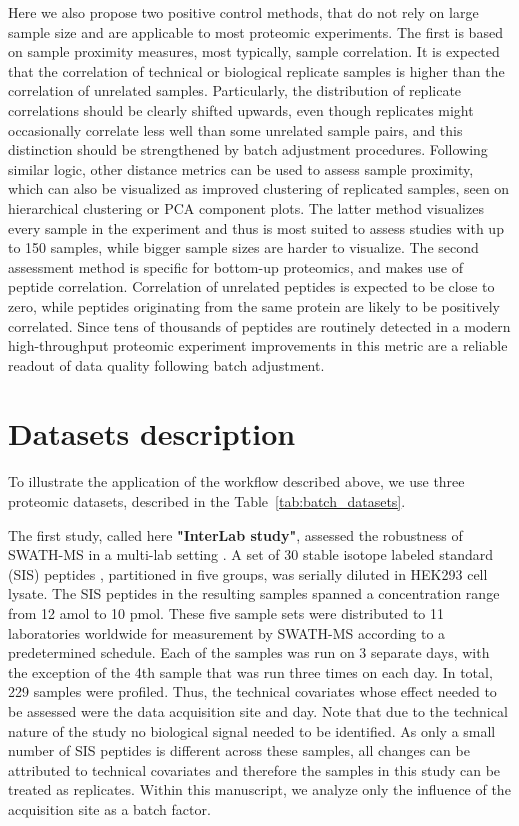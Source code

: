 \documentclass[num-refs]{wiley-article}
\begin{document}
Here we also propose two positive control methods, that do not rely on large sample size and are applicable to most proteomic experiments. The first is based on sample proximity measures, most typically, sample correlation. It is expected that the correlation of technical or biological replicate samples is higher than the correlation of unrelated samples. Particularly, the distribution of replicate correlations should be clearly shifted upwards, even though replicates might occasionally correlate less well than some unrelated sample pairs, and this distinction should be strengthened by batch adjustment procedures. Following similar logic, other distance metrics can be used to assess sample proximity, which can also be visualized as improved clustering of replicated samples, seen on hierarchical clustering or PCA component plots. The latter method visualizes every sample in the experiment and thus is most suited to assess studies with up to 150 samples, while bigger sample sizes are harder to visualize.
The second assessment method is specific for bottom-up proteomics, and makes use of peptide correlation. Correlation of unrelated peptides is expected to be close to zero, while peptides originating from the same protein are likely to be positively correlated. Since tens of thousands of peptides are routinely detected in a modern high-throughput proteomic experiment improvements in this metric are a reliable readout of data quality following batch adjustment.

\section{Datasets description}\label{subsec:datasets}

To illustrate the application of the workflow described above, we use three proteomic datasets, described in the Table~\ref{tab:batch_datasets}. 

The first study, called here \textbf{"InterLab study"}, assessed the robustness of SWATH-MS in a multi-lab setting \cite{Collins2017}. A set of 30 stable isotope labeled standard (SIS) peptides \cite{Ebhardt2012}, partitioned in five groups, was serially diluted in HEK293 cell lysate. The SIS peptides in the resulting samples spanned a concentration range from 12 amol to 10 pmol. These five sample sets were distributed to 11 laboratories worldwide for measurement by SWATH-MS according to a predetermined schedule. Each of the samples was run on 3 separate days, with the exception of the 4th sample that was run three times on each day. In total, 229 samples were profiled. Thus, the technical covariates whose effect needed to be assessed were the data acquisition site and day. Note that due to the technical nature of the study no biological signal needed to be identified. As only a small number of SIS peptides is different across these samples, all changes can be attributed to technical covariates and therefore the samples in this study can be treated as replicates. Within this manuscript, we analyze only the influence of the acquisition site as a batch factor.
\end{document}
